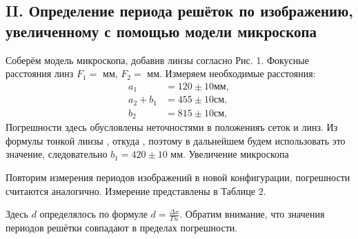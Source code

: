  
\subsection*{II. Определение периода решёток по изображению, увеличенному с помощью модели микроскопа}
  
Соберём модель микроскопа, добавив линзы согласно Рис. 1. Фокусные расстояния линз $F_{1}=  $ мм, $F_{2}= $ мм. Измеряем необходимые расстояния:
$$
\begin{aligned}
a_{1} &= 120  \pm 10 \mathrm{мм}, \\
a_{2}+b_{1} &= 455 \pm 10 \mathrm{см}, \\
b_{2} &= 815 \pm 10 \mathrm{см},
\end{aligned}
$$
Погрешности здесь обусловлены неточностями в положенияъ сеток и линз. Из формулы тонкой линзы , откуда , поэтому в дальнейшем будем использовать это значение, следовательно $b_{1}= 420\pm 10$ мм.  Увеличение микроскопа 

Повторим измерения периодов изображений в новой конфигурации, погрешности считаются аналогично. Измерение представлены в Таблице $2 .$

Здесь $d$ определялось по формуле $d=\frac{\Delta x}{\Gamma n}$. Обратим внимание, что значения периодов решётки совпадают в пределах погрешности.

